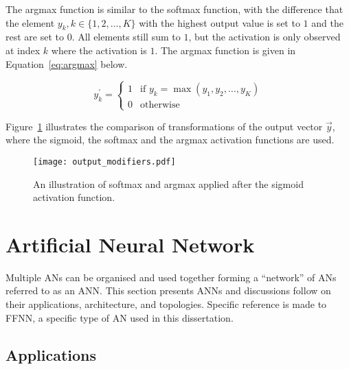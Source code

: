 The argmax function is similar to the softmax function, with the difference that the element $y_k, k \in \{1,2, \dots, K\}$ with the highest output value is set to $1$ and the rest are set to $0$. All elements still sum to $1$, but the activation is only observed at index $k$ where the activation is $1$. The argmax function is given in Equation~\eqref{eq:argmax} below.

\begin{equation}
      y^{'}_k =
      \begin{cases}
            1 & \text{if $y_k = \max(y_1, y_2, \dots, y_K)$} \\
            0 & \text{otherwise}
            \label{eq:argmax}
      \end{cases}
\end{equation}

\noindent
Figure~\ref{fig:anns:activation_functions:softmax_argmax} illustrates the comparison of transformations of the output vector $\vec{y}$, where the sigmoid, the softmax and the argmax activation functions are used.


\begin{figure}[htpb]
      \centering
      \texttt{[image: output\_modifiers.pdf]}
      \caption[The results of softmax and argmax]{An illustration of softmax and argmax applied after the sigmoid activation function.}
      \label{fig:anns:activation_functions:softmax_argmax}
\end{figure}


\section{Artificial Neural Network} \label{sec:anns:ann}

Multiple \acp{AN} can be organised and used together forming a ``network'' of \acp{AN} referred to as an \acf{ANN}. This section presents \acp{ANN} and discussions follow on their applications, architecture, and topologies. Specific reference is made to \acf{FFNN}, a specific type of \acs{AN} used in this dissertation.

\subsection{Applications} \label{sec:anns:anns:applications}

